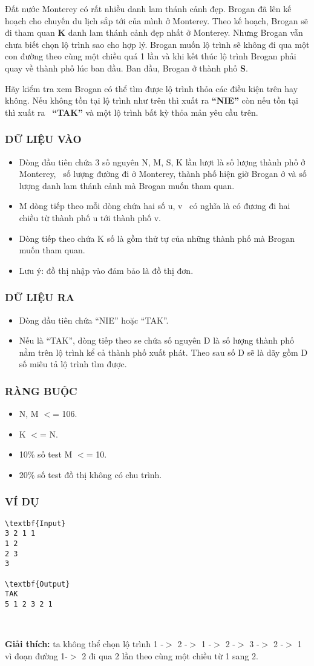 

Đất nước Monterey có rất nhiều danh lam thánh cảnh đẹp. Brogan đã lên kế hoạch cho chuyến du lịch sắp tới của mình ở Monterey. Theo kế hoạch, Brogan sẽ đi tham quan \textbf{K} danh lam thánh cảnh đẹp nhất ở Monterey. Nhưng Brogan vẫn chưa biết chọn lộ trình sao cho hợp lý. Brogan muốn lộ trình sẽ không đi qua một con đường theo cùng một chiều quá 1 lần và khi kết thúc lộ trình Brogan phải quay về thành phố lúc ban đầu. Ban đầu, Brogan ở thành phố \textbf{S}.

Hãy kiểm tra xem Brogan có thể tìm được lộ trình thỏa các điều kiện trên hay không. Nếu không tồn tại lộ trình như trên thì xuất ra \textbf{“NIE”} còn nếu tồn tại thì xuất ra  \textbf{“TAK”} và một lộ trình bất kỳ thỏa mản yêu cầu trên.

\subsubsection{DỮ LIỆU VÀO}
\begin{itemize}
	\item Dòng đầu tiên chứa 3 số nguyên N, M, S, K lần lượt là số lượng thành phố ở Monterey,  số lượng đường đi ở Monterey, thành phố hiện giờ Brogan ở và số lượng danh lam thánh cảnh mà Brogan muốn tham quan.
	\item M dòng tiếp theo mỗi dòng chứa hai số u, v  có nghĩa là có đương đi hai chiều từ thành phố u tới thành phố v.
	\item Dòng tiếp theo chứa K số là gồm thử tự của những thành phố mà Brogan muốn tham quan.
	\item Lưu ý: đồ thị nhập vào đảm bảo là đồ thị đơn.
\end{itemize}

\subsubsection{DỮ LIỆU RA}
\begin{itemize}
	\item Dòng đầu tiên chứa “NIE” hoặc “TAK”.
	\item Nếu là “TAK”, dòng tiếp theo se chứa số nguyên D là số lượng thành phố nằm trên lộ trình kể cả thành phố xuất phát. Theo sau số D sẽ là dãy gồm D số miêu tả lộ trình tìm được.
\end{itemize}

\subsubsection{RÀNG BUỘC}
\begin{itemize}
	\item N, M $<$= 106.
	\item K $<$= N.
	\item 10\% số test M $<$= 10.
	\item 20\% số test đồ thị không có chu trình.
\end{itemize}

\subsubsection{VÍ DỤ}
\begin{verbatim}
\textbf{Input}
3 2 1 1
1 2
2 3
3

\textbf{Output}
TAK
5 1 2 3 2 1\end{verbatim}

 

\textbf{Giải thích:} ta không thể chọn lộ trình 1 -$>$ 2 -$>$ 1 -$>$ 2 -$>$ 3 -$>$ 2 -$>$ 1 vì đoạn đường 1-$>$ 2 đi qua 2 lần theo cùng một chiều từ 1 sang 2.